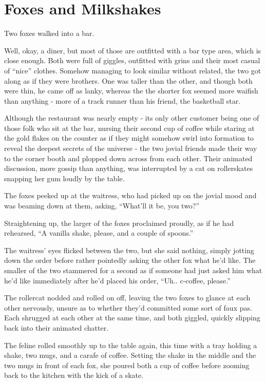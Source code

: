 \chapter{Foxes and Milkshakes}\label{foxes-and-milkshakes}

Two foxes walked into a bar.

Well, okay, a diner, but most of those are outfitted with a bar type area, which is close enough. Both were full of giggles, outfitted with grins and their most casual of ``nice'' clothes. Somehow managing to look similar without related, the two got along as if they were brothers. One was taller than the other, and though both were thin, he came off as lanky, whereas the the shorter fox seemed more waifish than anything - more of a track runner than his friend, the basketball star.

Although the restaurant was nearly empty - its only other customer being one of those folk who sit at the bar, nursing their second cup of coffee while staring at the gold flakes on the counter as if they might somehow swirl into formation to reveal the deepest secrets of the universe - the two jovial friends made their way to the corner booth and plopped down across from each other. Their animated discussion, more gossip than anything, was interrupted by a cat on rollerskates snapping her gum loudly by the table.

The foxes peeked up at the waitress, who had picked up on the jovial mood and was beaming down at them, asking, ``What'll it be, you two?''

Straightening up, the larger of the foxes proclaimed proudly, as if he had rehearsed, ``A vanilla shake, please, and a couple of spoons.''

The waitress' eyes flicked between the two, but she said nothing, simply jotting down the order before rather pointedly asking the other fox what he'd like. The smaller of the two stammered for a second as if someone had just asked him what he'd like immediately after he'd placed his order, ``Uh.. c-coffee, please.''

The rollercat nodded and rolled on off, leaving the two foxes to glance at each other nervously, unsure as to whether they'd committed some sort of faux pas. Each shrugged at each other at the same time, and both giggled, quickly slipping back into their animated chatter.

The feline rolled smoothly up to the table again, this time with a tray holding a shake, two mugs, and a carafe of coffee. Setting the shake in the middle and the two mugs in front of each fox, she poured both a cup of coffee before zooming back to the kitchen with the kick of a skate.

